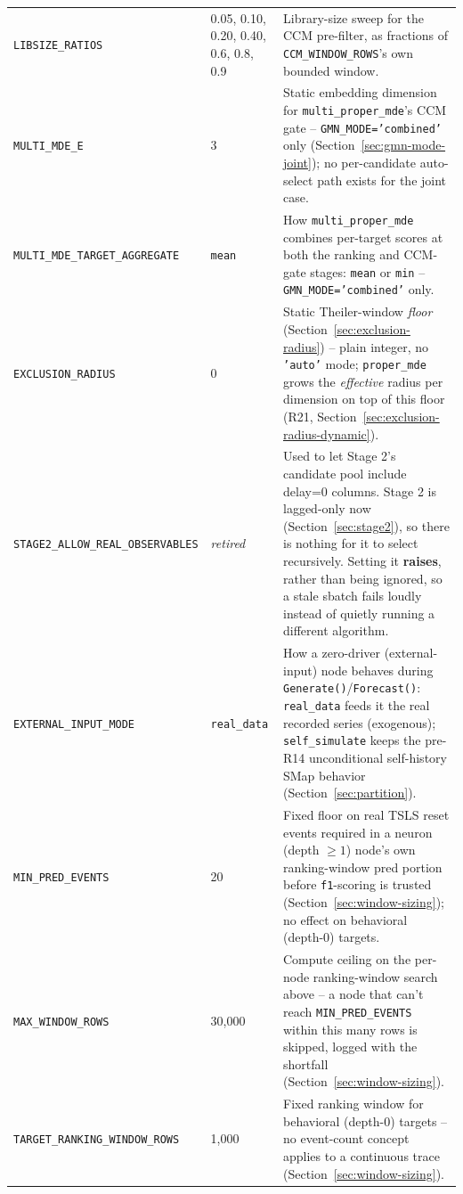 \documentclass[11pt]{article}
\begin{document}
\begin{longtable}{@{}>{\raggedright\arraybackslash}p{4.0cm}>{\raggedright\arraybackslash\small}p{2.6cm}>{\raggedright\arraybackslash}p{7.9cm}@{}}
\texttt{LIBSIZE\_RATIOS} & 0.05, 0.10, 0.20, 0.40, 0.6, 0.8, 0.9 & Library-size sweep for the CCM pre-filter, as fractions of \texttt{CCM\_WINDOW\_ROWS}'s own bounded window. \\
\texttt{MULTI\_MDE\_E} & 3 & Static embedding dimension for \texttt{multi\_proper\_mde}'s CCM gate -- \texttt{GMN\_MODE='combined'} only (Section~\ref{sec:gmn-mode-joint}); no per-candidate auto-select path exists for the joint case. \\
\texttt{MULTI\_MDE\_TARGET\_AGGREGATE} & \texttt{mean} & How \texttt{multi\_proper\_mde} combines per-target scores at both the ranking and CCM-gate stages: \texttt{mean} or \texttt{min} -- \texttt{GMN\_MODE='combined'} only. \\
\texttt{EXCLUSION\_RADIUS} & 0 & Static Theiler-window \emph{floor} (Section~\ref{sec:exclusion-radius}) -- plain integer, no \texttt{'auto'} mode; \texttt{proper\_mde} grows the \emph{effective} radius per dimension on top of this floor (R21, Section~\ref{sec:exclusion-radius-dynamic}). \\
\texttt{STAGE2\_ALLOW\_REAL\_OBSERVABLES} & \emph{retired} & Used to let Stage 2's candidate pool include delay=0 columns. Stage 2 is lagged-only now (Section~\ref{sec:stage2}), so there is nothing for it to select recursively. Setting it \textbf{raises}, rather than being ignored, so a stale sbatch fails loudly instead of quietly running a different algorithm. \\
\texttt{EXTERNAL\_INPUT\_MODE} & \texttt{real\_data} & How a zero-driver (external-input) node behaves during \texttt{Generate()}/\texttt{Forecast()}: \texttt{real\_data} feeds it the real recorded series (exogenous); \texttt{self\_simulate} keeps the pre-R14 unconditional self-history SMap behavior (Section~\ref{sec:partition}). \\
\texttt{MIN\_PRED\_EVENTS} & 20 & Fixed floor on real TSLS reset events required in a neuron (depth $\ge 1$) node's own ranking-window pred portion before \texttt{f1}-scoring is trusted (Section~\ref{sec:window-sizing}); no effect on behavioral (depth-0) targets. \\
\texttt{MAX\_WINDOW\_ROWS} & 30{,}000 & Compute ceiling on the per-node ranking-window search above -- a node that can't reach \texttt{MIN\_PRED\_EVENTS} within this many rows is skipped, logged with the shortfall (Section~\ref{sec:window-sizing}). \\
\texttt{TARGET\_RANKING\_WINDOW\_ROWS} & 1{,}000 & Fixed ranking window for behavioral (depth-0) targets -- no event-count concept applies to a continuous trace (Section~\ref{sec:window-sizing}). \\

\end{longtable}
\end{document}
